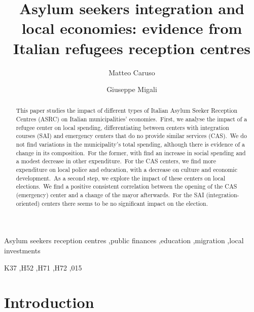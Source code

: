 \documentclass[authoryear,preprint,review,12pt]{elsarticle}
\begin{document}
\begin{frontmatter}


\title{Asylum seekers integration and local economies: evidence from Italian refugees reception centres}
\author[inst1]{Matteo Caruso}
\author[inst2]{Giuseppe Migali}
 \date{}




\begin{abstract}
 
\noindent
This paper studies the impact of different types of Italian Asylum Seeker Reception Centres (ASRC) on Italian municipalities' economies.\ First, we analyse the impact of a refugee center on local spending, differentiating between centers with integration courses (SAI) and emergency centers that do no provide similar services (CAS).\ We do not find variations in the municipality's total spending, although there is evidence of a change in its composition.\ For the former, with find an increase in social spending and a modest decrease in other expenditure.\ For the CAS centers, we find more expenditure on local police and education, with a decrease on culture and economic development.\ As a second step, we explore the impact of these centers on local elections.\ We find a positive consistent correlation between the opening of the CAS (emergency) center and a change of the mayor afterwards.\ For the SAI (integration-oriented) centers there seems to be no significant impact on the election.\ 
\end{abstract}


\begin{keyword}
Asylum seekers reception centres \sep public finances \sep education \sep migration \sep local investments

\JEL K37 \sep H52 \sep H71 \sep H72 \sep 015
\end{keyword}



\end{frontmatter}

\section{Introduction}
\end{document}
